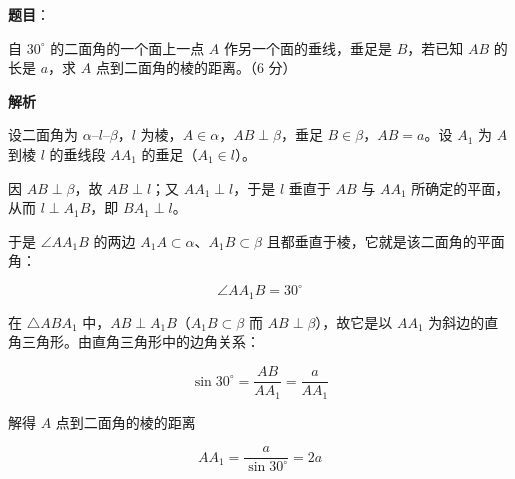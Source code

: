 \begin{answer}

\textbf{题目}：

自 $30^\circ$ 的二面角的一个面上一点 $A$ 作另一个面的垂线，垂足是 $B$，若已知 $AB$ 的长是 $a$，求 $A$ 点到二面角的棱的距离。（6 分）

\textbf{解析}

设二面角为 $\alpha\text{--}l\text{--}\beta$，$l$ 为棱，$A\in\alpha$，$AB\perp\beta$，垂足 $B\in\beta$，$AB=a$。设 $A_{1}$ 为 $A$ 到棱 $l$ 的垂线段 $AA_{1}$ 的垂足（$A_{1}\in l$）。

因 $AB\perp\beta$，故 $AB\perp l$；又 $AA_{1}\perp l$，于是 $l$ 垂直于 $AB$ 与 $AA_{1}$ 所确定的平面，从而 $l\perp A_{1}B$，即 $BA_{1}\perp l$。

于是 $\angle AA_{1}B$ 的两边 $A_{1}A\subset\alpha$、$A_{1}B\subset\beta$ 且都垂直于棱，它就是该二面角的平面角：

\nopagebreak[4]
\[
\angle AA_{1}B=30^\circ
\]

在 $\triangle ABA_{1}$ 中，$AB\perp A_{1}B$（$A_{1}B\subset\beta$ 而 $AB\perp\beta$），故它是以 $AA_{1}$ 为斜边的直角三角形。由直角三角形中的边角关系：

\nopagebreak[4]
\[
\sin 30^\circ=\frac{AB}{AA_{1}}=\frac{a}{AA_{1}}
\]

解得 $A$ 点到二面角的棱的距离

\nopagebreak[4]
\[
AA_{1}=\frac{a}{\sin 30^\circ}=2a
\]


\end{answer}
